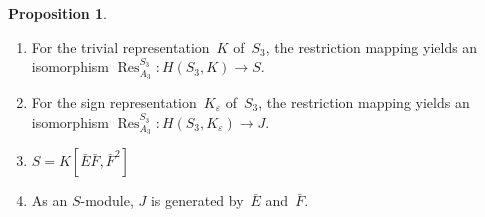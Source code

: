 \documentclass[12pt]{article}
\newcounter{num}
\theoremstyle{definition}
\newtheorem{Proposition}[Satz]{Proposition}
\theoremstyle{break}
\DeclareMathOperator\Res{Res}
\renewcommand{\1}{\mathbbm{1}}
\begin{document}
\begin{Proposition} \label{CohomRingSym}
\begin{enumerate}
\item
For the trivial representation~$K$ of~$S_3$, the restriction mapping yields an isomorphism
$\Res^{S_3}_{A_3} \colon H(S_3, K) \to S$.

\item
For the sign representation~$K_\varepsilon$ of~$S_3$, the restriction mapping yields an isomorphism
$\Res^{S_3}_{A_3} \colon H(S_3, K_\varepsilon) \to J$.

\item
$S = K[\bar{E} \bar{F}, \bar{F}^2]$

\item
As an $S$-module, $J$ is generated by~$\bar{E}$ and~$\bar{F}$.
\end{enumerate}
\end{Proposition}
\end{document}
